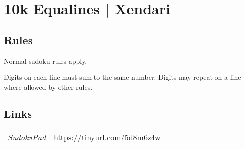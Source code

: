 \section[10k Equalines | Xendari {[\emph{Sudoku, Equalines}]}]{10k Equalines | {\normalfont Xendari}}
\label{sec:39-10k-equalines-xendari}

\subsection*{Rules}
\begin{markdown}
Normal sudoku rules apply.



Digits on each line must sum to the same number. Digits may repeat on a line where allowed by other rules.
\end{markdown}
\subsection*{Links}
\begin{tabularx}{\textwidth}{l X}
\emph{SudokuPad} & \url{https://tinyurl.com/5d8m6z4w} \\
\end{tabularx}
\pagebreak
